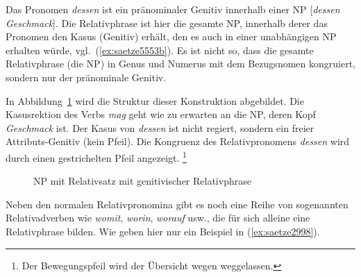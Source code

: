 
Das Pronomen \textit{dessen} ist ein pränominaler Genitiv innerhalb einer NP [\textit{dessen Geschmack}].
Die Relativphrase ist hier die gesamte NP, innerhalb derer das Pronomen den Kasus (Genitiv) erhält, den es auch in einer unabhängigen NP erhalten würde, vgl.\ (\ref{ex:saetze5553b}).
Es ist nicht so, dass die gesamte Relativphrase (die NP) in Genus und Numerus mit dem Bezugsnomen kongruiert, sondern nur der pränominale Genitiv.

In Abbildung~\ref{fig:saetze5553} wird die Struktur dieser Konstruktion abgebildet.
Die Kasusrektion des Verbs \textit{mag} geht wie zu erwarten an die NP, deren Kopf \textit{Geschmack} ist.
Der Kasus von \textit{dessen} ist nicht regiert, sondern ein freier Attributs-Genitiv (kein Pfeil).
Die Kongruenz des Relativpronomens \textit{dessen} wird durch einen gestrichelten Pfeil angezeigt.%
\footnote{Der Bewegungspfeil wird der Übersicht wegen weggelassen.}

\begin{figure}[!h]
  \centering
  \caption{NP mit Relativsatz mit genitivischer Relativphrase}
  \label{fig:saetze5553}
\end{figure}


Neben den normalen Relativpronomina gibt es noch eine Reihe von sogenannten Relativadverben wie \textit{womit}, \textit{worin}, \textit{worauf} usw., die für sich alleine eine Relativphrase bilden.
Wie geben hier nur ein Beispiel in (\ref{ex:saetze2998}).

\begin{exe}
\end{exe}

